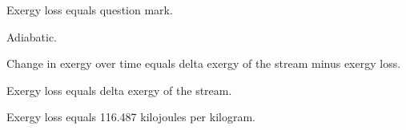 Exergy loss equals question mark.  

Adiabatic.  

Change in exergy over time equals delta exergy of the stream minus exergy loss.  

Exergy loss equals delta exergy of the stream.  

Exergy loss equals 116.487 kilojoules per kilogram.
